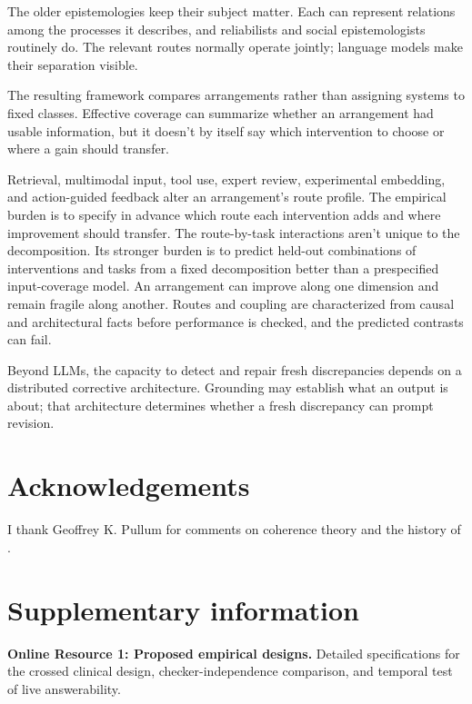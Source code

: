 \documentclass[12pt]{article}
\newif\ifttpanonymous
\begin{document}
The older epistemologies keep their subject matter. Each can represent relations among
the processes it describes, and reliabilists and social epistemologists routinely do. The
relevant routes normally operate jointly; language models make their separation visible.

The resulting framework compares arrangements rather than assigning systems to fixed
classes. Effective coverage can summarize whether an arrangement had usable information,
but it doesn't by itself say which intervention to choose or where a gain should transfer.

Retrieval, multimodal input, tool use, expert review, experimental embedding, and
action-guided feedback alter an arrangement's route profile. The empirical burden is to
specify in advance which route each intervention adds and where improvement should
transfer. The route-by-task interactions aren't unique to the decomposition. Its stronger
burden is to predict held-out combinations of interventions and tasks from a fixed decomposition
better than a prespecified input-coverage model. An arrangement can improve along one dimension
and remain fragile along another. Routes and coupling are characterized from causal and
architectural facts before performance is checked, and the predicted contrasts can fail.

Beyond LLMs, the capacity to detect and repair fresh discrepancies depends on a distributed
corrective architecture. Grounding may establish what an output is about; that architecture
determines whether a fresh discrepancy can prompt revision.

\ifttpanonymous\else
\section*{Acknowledgements}
I thank Geoffrey K. Pullum for comments on coherence theory and the history of
.
\fi

\section*{Supplementary information}
\textbf{Online Resource 1: Proposed empirical designs.} Detailed specifications for the
crossed clinical design, checker-independence comparison, and temporal test of live
answerability.

\clearpage
\printbibliography
\end{document}
